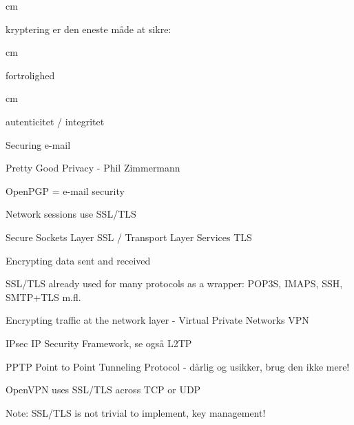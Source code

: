 
 cm
\centerline{\hlkbig kryptering er den eneste måde at sikre:}
 cm
\centerline{\hlkbig fortrolighed}
 cm
\centerline{\hlkbig autenticitet / integritet}



\begin{list1}
\item Securing e-mail
\begin{list2}
\item Pretty Good Privacy - Phil Zimmermann
\item OpenPGP = e-mail security
\end{list2}
\item Network sessions use SSL/TLS
\begin{list2}
\item Secure Sockets Layer SSL / Transport Layer Services TLS
\item Encrypting data sent and received
\item SSL/TLS already used for many protocols as a wrapper: POP3S, IMAPS, SSH, SMTP+TLS m.fl.
\end{list2}
\item Encrypting traffic at the network layer - Virtual Private Networks VPN
\begin{list2}
\item {\color{green}IPsec IP Security Framework, se også L2TP}
\item {\color{red} PPTP Point to Point Tunneling Protocol - dårlig og usikker, brug den ikke mere!}
\item OpenVPN uses SSL/TLS across TCP or UDP
\end{list2}
\end{list1}

\centerline{Note: SSL/TLS is not trivial to implement, key management!}


